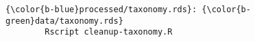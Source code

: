 \documentclass[class=minimal,border=0]{standalone}
\begin{document}
%
\begin{BVerbatim}[bgcolor=b-darkgrey]
{\color{b-blue}processed/taxonomy.rds}: {\color{b-green}data/taxonomy.rds}
        Rscript cleanup-taxonomy.R
\end{BVerbatim}
\end{document}
